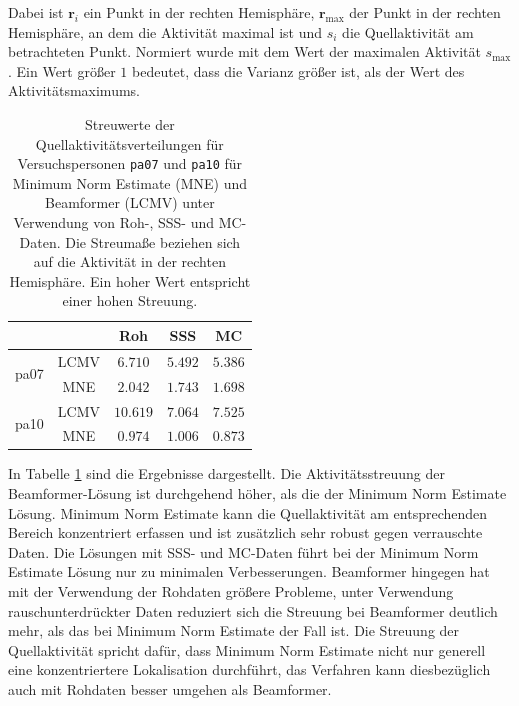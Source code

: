 \documentclass[doc,a4paper,12pt]{apa6}
\newcommand{\mx}[1]{\mathbf{#1}}
\renewcommand{\arraystretch}{1.2}
\begin{document}
Dabei ist $\mx{r}_i$ ein Punkt in der rechten Hemisphäre, $\mx{r}_{\text{max}}$ der Punkt in der rechten Hemisphäre, an dem die Aktivität maximal ist und $s_i$ die Quellaktivität am betrachteten Punkt. Normiert wurde mit dem Wert der maximalen Aktivität $s_{\text{max}}$. Ein Wert größer $1$ bedeutet, dass die Varianz größer ist, als der Wert des Aktivitätsmaximums.

\begin{table}[t]
  \caption{}
  \label{tab:distribution}
  \vspace*{3mm}
  \centering
  \setlength{\tabcolsep}{1cm}
  \renewcommand{\arraystretch}{1.5}
  \begin{tabular}{ccccc}
  \hline
  & & Roh & SSS & MC\\
  \hline
  \multirow{2}{*}{pa07} & LCMV & $6.710$ & $5.492$ & $5.386$\\
  & MNE & $2.042$ & $1.743$ & $1.698$\\
  \hline
  \multirow{2}{*}{pa10} & LCMV & $10.619$ & $7.064$ & $7.525$\\
  & MNE & $0.974$ & $1.006$ & $0.873$\\
  \hline
  \end{tabular}
  \vspace*{3mm}
  \caption*{Streuwerte der Quellaktivitätsverteilungen für Versuchspersonen \texttt{pa07} und \texttt{pa10} für Minimum Norm Estimate (MNE) und Beamformer (LCMV) unter Verwendung von Roh-, SSS- und MC-Daten. Die Streumaße beziehen sich auf die Aktivität in der rechten Hemisphäre. Ein hoher Wert entspricht einer hohen Streuung.}
\end{table}

In Tabelle \ref{tab:distribution} sind die Ergebnisse dargestellt. Die Aktivitätsstreuung der Beamformer-Lösung ist durchgehend höher, als die der Minimum Norm Estimate Lösung. Minimum Norm Estimate kann die Quellaktivität am entsprechenden Bereich konzentriert erfassen und ist zusätzlich sehr robust gegen verrauschte Daten. Die Lösungen mit SSS- und MC-Daten führt bei der Minimum Norm Estimate Lösung nur zu minimalen Verbesserungen. Beamformer hingegen hat mit der Verwendung der Rohdaten größere Probleme, unter Verwendung rauschunterdrückter Daten reduziert sich die Streuung bei Beamformer deutlich mehr, als das bei Minimum Norm Estimate der Fall ist. Die Streuung der Quellaktivität spricht dafür, dass Minimum Norm Estimate nicht nur generell eine konzentriertere Lokalisation durchführt, das Verfahren kann diesbezüglich auch mit Rohdaten besser umgehen als Beamformer.
\end{document}
